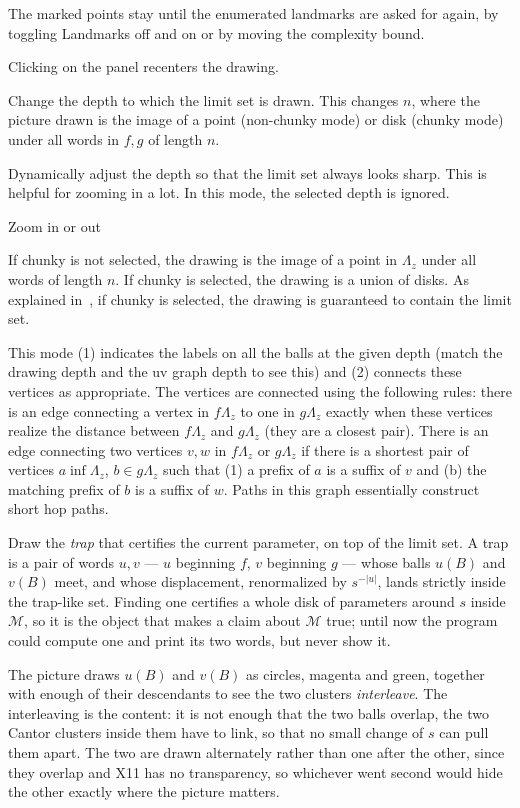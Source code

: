 \documentclass{amsart}
\begin{document}
\begin{description}
The marked points stay until the enumerated landmarks are asked for again, by toggling
Landmarks off and on or by moving the complexity bound.

\item[Clicking] Clicking on the panel recenters the drawing.
\item[Depth] Change the depth to which the limit set is drawn.  This changes $n$, 
where the picture drawn is the image of a point (non-chunky mode) or 
disk (chunky mode) under all words in $f,g$ of length $n$.
\item[Auto depth] Dynamically adjust the depth so that 
the limit set always looks sharp.  This is helpful for zooming in a lot. 
In this mode, the selected 
depth is ignored.
\item[Zoom] Zoom in or out
\item[Chunky]  If chunky is not selected, the drawing is the image 
of a point in $\Lambda_z$ under all words of length $n$.  If chunky is 
selected, the drawing is a union of disks.  As explained in~\cite{paper}, 
if chunky is selected, the drawing is guaranteed to contain the limit set.
\item[uv graph] This mode (1) indicates the labels on all 
the balls at the given depth (match the drawing depth and the uv graph 
depth to see this) and (2) connects these vertices as appropriate.  
The vertices are connected using the following rules: there is an 
edge connecting a vertex in $f\Lambda_z$ to one in $g\Lambda_z$ 
exactly when these vertices realize the distance between $f\Lambda_z$ and $g\Lambda_z$ 
(they are a closest pair).  
There is an edge connecting two vertices $v,w$ in $f\Lambda_z$ or 
$g\Lambda_z$ if there is a shortest pair of vertices $a\inf\Lambda_z$, $b\in g\Lambda_z$
such that (1) a prefix of $a$ is a suffix of $v$ and (b) the matching prefix of 
$b$ is a suffix of $w$.  Paths in this graph essentially construct short hop paths.
\item[Trap] Draw the \emph{trap} that certifies the current parameter, on top of the limit
set.  A trap is a pair of words $u,v$ --- $u$ beginning $f$, $v$ beginning $g$ --- whose
balls $u(B)$ and $v(B)$ meet, and whose displacement, renormalized by $s^{-|u|}$, lands
strictly inside the trap-like set.  Finding one certifies a whole disk of parameters around
$s$ inside $\mathcal{M}$, so it is the object that makes a claim about $\mathcal{M}$ true;
until now the program could compute one and print its two words, but never show it.

The picture draws $u(B)$ and $v(B)$ as circles, magenta and green, together with enough of
their descendants to see the two clusters \emph{interleave}.  The interleaving is the
content: it is not enough that the two balls overlap, the two Cantor clusters inside them
have to link, so that no small change of $s$ can pull them apart.  The two are drawn
alternately rather than one after the other, since they overlap and X11 has no
transparency, so whichever went second would hide the other exactly where the picture
matters.


\end{description}
\end{document}
